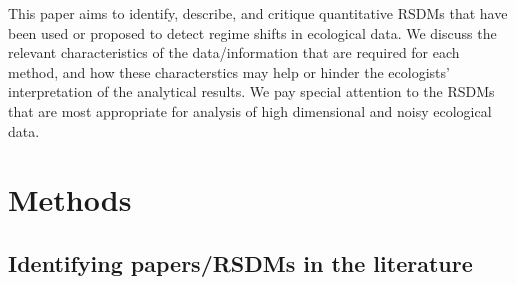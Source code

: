 \documentclass[12pt,twoside]{reedthesis}
\begin{document}
This paper aims to identify, describe, and critique quantitative RSDMs
that have been used or proposed to detect regime shifts in ecological
data. We discuss the relevant characteristics of the data/information
that are required for each method, and how these characterstics may help
or hinder the ecologists' interpretation of the analytical results. We
pay special attention to the RSDMs that are most appropriate for
analysis of high dimensional and noisy ecological data.

\section{Methods}\label{methods}

\subsection{Identifying papers/RSDMs in the
literature}\label{identifying-papersrsdms-in-the-literature}
\end{document}
